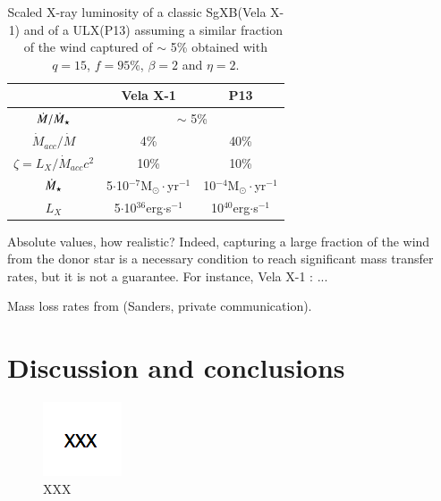 \documentclass[letter]{aa}
\newcommand{\sgx}{SgXB\xspace}
\newcommand{\ulx}{ULX\xspace}
\newcommand{\mystar}{{\fontfamily{lmr}\selectfont$\star$}}
\begin{document}
\begin{center}
\begin{table}[!h]
\caption{Scaled X-ray luminosity of a classic \sgx (Vela X-1) and of a \ulx (P13) assuming a similar fraction of the wind captured of $\sim$ 5\% obtained with $q=15$, $f=95\%$, $\beta=2$ and $\eta=2$.}
\label{tab:params}
\centering
\begin{tabularx}{0.83\columnwidth}{c|c|c}
   & Vela X-1 & P13 \\
  \hline
  $\dot{M}/\dot{M}_{\text{\mystar}}$ & \multicolumn{2}{c}{$\sim$ 5\%} \\
  \hline
  $\dot{M}_{acc}/\dot{M}$ & 4\%  & 40\% \\
  $\zeta=L_X/\dot{M}_{acc}c^2$ & 10\% & 10\% \\
  $\dot{M}_{\text{\mystar}}$ & 5$\cdot$10$^{-7}$M$_{\odot}\cdot$yr$^{-1}$ & 10$^{-4}$M$_{\odot}\cdot$yr$^{-1}$ \\
  $L_X$ & 5$\cdot$10$^{36}$erg$\cdot$s$^{-1}$ & 10$^{40}$erg$\cdot$s$^{-1}$ \\
\end{tabularx}
\end{table}
\end{center}

Absolute values, how realistic? Indeed, capturing a large fraction of the wind from the donor star is a necessary condition to reach significant mass transfer rates, but it is not a guarantee. For instance, Vela X-1 : ...

Mass loss rates from \cite{Vink2000,Vink2001} (Sanders, private communication).


\section{Discussion and conclusions}
\label{sec:}

\begin{figure}
\centering
\includegraphics[width=0.99\columnwidth]{Pictures/BHL.png}
\caption{XXX}
\label{fig:BHL}
\end{figure}
\end{document}
